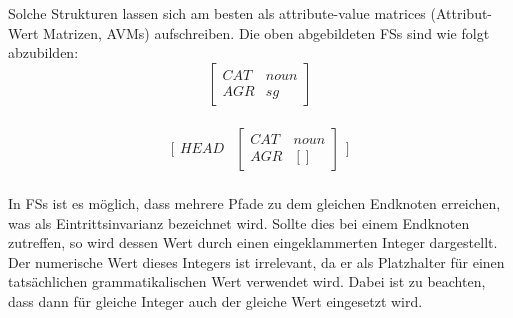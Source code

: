 \documentclass[12pt]{paper}
\begin{document}
Solche Strukturen lassen sich am besten als attribute-value matrices (Attribut-Wert Matrizen, AVMs) aufschreiben. Die oben abgebildeten FSs sind wie folgt abzubilden:
\\
\begin{displaymath}
\begin{bmatrix} 
CAT & noun \\
AGR & sg 
\end{bmatrix} 
\end{displaymath}
\\
\begin{displaymath}
\bigg[
\begin{matrix}
HEAD &
\begin{bmatrix} 
CAT & noun \\
AGR & [] 
\end{bmatrix} 
\end{matrix}
\bigg]
\end{displaymath}
\\

In FSs ist es möglich, dass mehrere Pfade zu dem gleichen Endknoten erreichen, was als Eintrittsinvarianz bezeichnet wird. Sollte dies bei einem Endknoten zutreffen, so wird dessen Wert durch einen eingeklammerten Integer dargestellt. Der numerische Wert dieses Integers ist irrelevant, da er als Platzhalter für einen tatsächlichen grammatikalischen Wert verwendet wird. Dabei ist zu beachten, dass dann für gleiche Integer auch der gleiche Wert eingesetzt wird.
\end{document}
